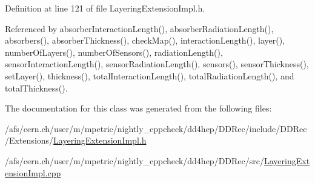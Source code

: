 Definition at line 121 of file Layering\+Extension\+Impl.\+h.



Referenced by absorber\+Interaction\+Length(), absorber\+Radiation\+Length(), absorbers(), absorber\+Thickness(), check\+Map(), interaction\+Length(), layer(), number\+Of\+Layers(), number\+Of\+Sensors(), radiation\+Length(), sensor\+Interaction\+Length(), sensor\+Radiation\+Length(), sensors(), sensor\+Thickness(), set\+Layer(), thickness(), total\+Interaction\+Length(), total\+Radiation\+Length(), and total\+Thickness().



The documentation for this class was generated from the following files\+:\begin{DoxyCompactItemize}
\item 
/afs/cern.\+ch/user/m/mpetric/nightly\+\_\+cppcheck/dd4hep/\+D\+D\+Rec/include/\+D\+D\+Rec/\+Extensions/\hyperlink{_layering_extension_impl_8h}{Layering\+Extension\+Impl.\+h}\item 
/afs/cern.\+ch/user/m/mpetric/nightly\+\_\+cppcheck/dd4hep/\+D\+D\+Rec/src/\hyperlink{_layering_extension_impl_8cpp}{Layering\+Extension\+Impl.\+cpp}\end{DoxyCompactItemize}
